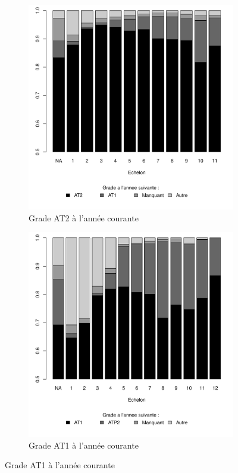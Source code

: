 \documentclass[11pt,a4paper]{article}
\begin{document}
\begin{figure}[ht] 
  \caption{Situation d'une année à l'autre, selon l'échelon}
  \label{echelon_by_neg} 
  \begin{subfigure}[b]{0.65\linewidth}
      \caption{Grade AT2 à l'année courante}
      \vspace{-0.5cm} 
    \label{echelon_by_neg_0} 
    \centering
    \includegraphics[width=1\linewidth]{next_AT2.pdf} 
  \end{subfigure}
  \begin{subfigure}[b]{0.65\linewidth}
        \caption{Grade AT1 à l'année courante} 
              \vspace{-0.5cm} 
    \label{echelon_by_neg_1} 
    \centering
    \includegraphics[width=1\linewidth]{next_AT1.pdf} 

\end{subfigure}
\end{figure}
\end{document}
